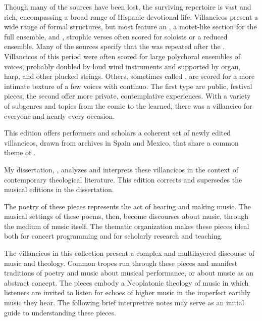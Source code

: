 Though many of the sources have been lost, the surviving repertoire is vast and 
rich, encompassing a broad range of Hispanic devotional life.
Villancicos present a wide range of formal structures, but most feature an 
, a motet-like section for the full ensemble, and 
, strophic verses often scored for soloists or a reduced ensemble.
Many of the sources specify that the  was repeated after
the .
Villancicos of this period were often scored for large polychoral ensembles of 
voices, probably doubled by loud wind instruments and supported by organ, harp, 
and other plucked strings.
Others, sometimes called , are scored for a more intimate 
texture of a few voices with continuo.
The first type are public, festival pieces; the second offer more private, 
contemplative experiences.
With a variety of subgenres and topics from the comic to the learned, there was 
a villancico for everyone and nearly every occasion.

This edition offers performers and scholars a coherent set of newly edited 
villancicos, drawn from archives in Spain and Mexico, that share a common theme 
of .%
\begin{Footnote}
  My dissertation, \autocite{Cashner:PhD}, analyzes and interprets these 
  villancicos in the context of contemporary theological literature.
  This edition corrects and supersedes the musical editions in the dissertation.
\end{Footnote}
The poetry of these  pieces represents the act 
of hearing and making music.
The musical settings of these poems, then, become discourses about music, 
through the medium of music itself.
The thematic organization makes these pieces ideal both for concert programming 
and for scholarly research and teaching.


The villancicos in this collection present a complex and multilayered discourse 
of music and theology.
Common tropes run through these pieces and manifest traditions of poetry and 
music about musical performance, or about music as an abstract concept.
The pieces embody a Neoplatonic theology of music in which listeners are 
invited to listen for echoes of higher music in the imperfect earthly music 
they hear.%
    \Autocite[108--132]{Cashner:PhD}
The following brief interpretive notes may serve as an initial guide to 
understanding these pieces.

